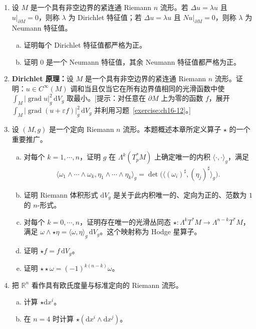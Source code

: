 \documentclass[../../main.tex]{subfiles}
\begin{document}
\begin{enumerate}
\item\label{exercise:ch16-16} 设 $M$ 是一个具有非空边界的紧连通 Riemann $n$ 流形。若 $\Delta u=\lambda u$ 且 $u|_{\partial M}=0$，则称 $\lambda$ 为 Dirichlet 特征值；若 $\Delta u=\lambda u$ 且 $Nu|_{\partial M}=0$，则称 $\lambda$ 为 Neumann 特征值。
\begin{enumerate}[(a)]
\item 证明每个 Dirichlet 特征值都严格为正。
\item 证明 $0$ 是一个 Neumann 特征值，其余 Neumann 特征值都严格为正。
\end{enumerate}

\item\label{exercise:ch16-17} \textbf{Dirichlet 原理：}设 $M$ 是一个具有非空边界的紧连通 Riemann $n$ 流形。证明：$u\in C^\infty(M)$ 调和当且仅当它在所有边界值相同的光滑函数中使 $\int_M|\operatorname{grad}u|_g^2\,\mathrm{d}V_g$ 取最小。[提示：对任意在 $\partial M$ 上为零的函数 $f$，展开 $\int_M|\operatorname{grad}(u+\varepsilon f)|_g^2\,\mathrm{d}V_g$ 并利用习题~\cref{exercise:ch16-12}。]

\item\label{exercise:ch16-18} 设 $(M,g)$ 是一个定向 Riemann $n$ 流形。本题概述本章所定义算子 $\star$ 的一个重要推广。
\begin{enumerate}[(a)]
\item 对每个 $k=1,\cdots ,n$，证明 $g$ 在 $\Lambda^k(T_p^*M)$ 上确定唯一的内积 $\langle\cdot,\cdot\rangle_g$，满足
\begin{align*}
\langle\omega_1\wedge\cdots\wedge\omega_k,\eta_1\wedge\cdots\wedge\eta_k\rangle_g=\det\bigl(\langle(\omega_i)^\sharp,(\eta_j)^\sharp\rangle_g\bigr).
\end{align*}
\item 证明 Riemann 体积形式 $\mathrm{d}V_g$ 是关于此内积唯一的、定向为正的、范数为 $1$ 的 $n$-形式。
\item 对每个 $k=0,\cdots ,n$，证明存在唯一的光滑丛同态 $\star:\Lambda^kT^*M\to\Lambda^{n-k}T^*M$，满足 $\omega\wedge\star\eta=\langle\omega,\eta\rangle_g\,\mathrm{d}V_g$。这个映射称为 Hodge 星算子。
\item 证明 $\star f=f\,\mathrm{d}V_g$。
\item 证明 $\star\star\omega=(-1)^{k(n-k)}\omega$。
\end{enumerate}

\item\label{exercise:ch16-19} 把 $\mathbb{R}^n$ 看作具有欧氏度量与标准定向的 Riemann 流形。
\begin{enumerate}[(a)]
\item 计算 $\star\mathrm{d}x^i$。
\item 在 $n=4$ 时计算 $\star(\mathrm{d}x^i\wedge\mathrm{d}x^j)$。
\end{enumerate}


\end{enumerate}
\end{document}

